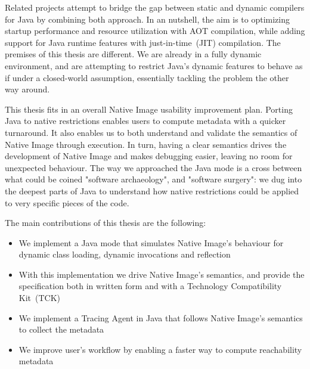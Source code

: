Related projects attempt to bridge the gap between static and dynamic compilers for Java by combining both approach. In an nutshell, the aim is to optimizing startup performance and resource utilization with AOT compilation, while adding support for Java runtime features with just-in-time~(JIT) compilation. The premises of this thesis are different. We are already in a fully dynamic environment, and are attempting to restrict Java's dynamic features to behave as if under a closed-world assumption, essentially tackling the problem the other way around. 

This thesis fits in an overall Native Image usability improvement plan. Porting Java to native restrictions enables users to compute metadata with a quicker turnaround. It also enables us to both understand and validate the semantics of Native Image through execution. In turn, having a clear semantics drives the development of Native Image and makes debugging easier, leaving no room for unexpected behaviour.
The way we approached the Java mode is a cross between what could be coined "software archaeology", and "software surgery": we dug into the deepest parts of Java to understand how native restrictions could be applied to very specific pieces of the code.

The main contributions of this thesis are the following:
\begin{itemize}
  \item We implement a Java mode that simulates Native Image's behaviour for dynamic class loading, dynamic invocations and reflection
  \item With this implementation we drive Native Image's semantics, and provide the specification both in written form and with a Technology Compatibility Kit~(TCK) 
  \item We implement a Tracing Agent in Java that follows Native Image's semantics to collect the metadata 
  \item We improve user's workflow by enabling a faster way to compute reachability metadata
\end{itemize}
